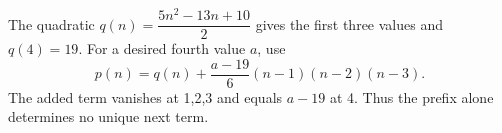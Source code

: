 The quadratic $ q(n)=\dfrac{5n^2-13n+10}{2}$ gives the first three values and $ q(4)=19 $. For a desired fourth value $ a $, use \[p(n)=q(n)+\dfrac{a-19}{6}(n-1)(n-2)(n-3).\]The added term vanishes at 1,2,3 and equals $ a-19 $ at 4. Thus the prefix alone determines no unique next term.
